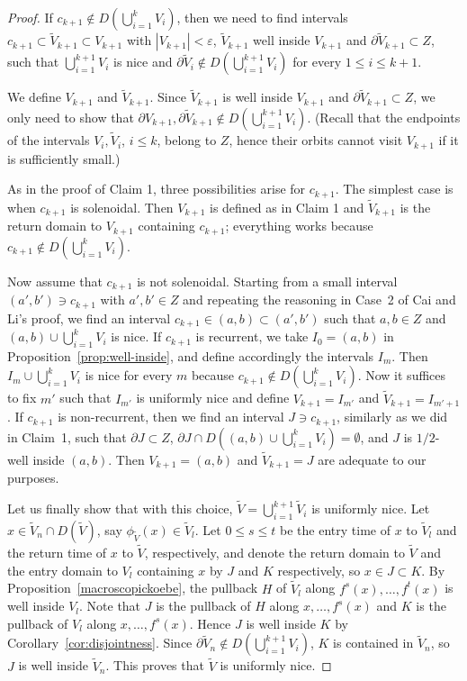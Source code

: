 \documentclass[12pt, psamsfonts, reqno]{amsart}
\begin{document}
\begin{proof}
 If $c_{k+1}\notin D(\bigcup_{i=1}^k V_i)$, then we need to find
 intervals $c_{k+1}\subset \tilde V_{k+1}\subset V_{k+1}$ with
 $|V_{k+1}|<{\varepsilon}$, $\tilde V_{k+1}$ well inside $V_{k+1}$ and
 $\partial \tilde V_{k+1}\subset Z$, such that $\bigcup_{i=1}^{k+1} V_i$ is
 nice and $\partial \tilde V_i\notin D(\bigcup_{i=1}^{k+1} V_i)$ for
 every $1\leq i\leq k+1$.

 We define $V_{k+1}$ and $\tilde V_{k+1}$.
 Since $\tilde V_{k+1}$ is well inside
 $V_{k+1}$ and $\partial \tilde V_{k+1}\subset Z$, we only need
 to show that $\partial V_{k+1},\partial \tilde V_{k+1}
 \notin D(\bigcup_{i=1}^{k+1} V_i)$. (Recall that the endpoints of the intervals $V_i,\tilde
 V_i$, $i\leq k$, belong to $Z$, hence their orbits cannot visit
 $V_{k+1}$ if it is sufficiently small.)

 As in the proof of Claim 1, three possibilities
 arise for $c_{k+1}$. The simplest case is when $c_{k+1}$ is
 solenoidal. Then $V_{k+1}$ is defined as in Claim 1 and $\tilde
 V_{k+1}$ is the return domain to $V_{k+1}$ containing $c_{k+1}$;
 everything works because $c_{k+1}\notin D(\bigcup_{i=1}^k V_i)$.

 Now assume that $c_{k+1}$ is not solenoidal. Starting from a
 small interval $(a',b')\owns c_{k+1}$ with $a',b'\in Z$
 and repeating the reasoning in Case~2 of Cai and Li's proof, we
 find an interval $c_{k+1}\in (a,b)\subset (a',b')$ such that
 $a,b\in Z$ and
 $(a,b)\cup \bigcup_{i=1}^k V_i$ is nice. If $c_{k+1}$ is recurrent,
 we take $I_0=(a,b)$ in  Proposition~\ref{prop:well-inside},
 and define accordingly the intervals $I_m$.
 Then $I_m\cup \bigcup_{i=1}^k V_i$ is nice for every $m$
 because $c_{k+1}\notin D(\bigcup_{i=1}^k V_i)$. Now it suffices to
 fix $m'$ such that $I_{m'}$ is uniformly nice and
 define $V_{k+1}=I_{m'}$ and $\tilde V_{k+1}=I_{m'+1}$. If
 $c_{k+1}$ is non-recurrent, then we find an
 interval $J\owns c_{k+1}$, similarly as we did in
 Claim~1, such that
 $\partial J\subset Z$,
 $\partial J\cap D((a,b)\cup \bigcup_{i=1}^k V_i)=\emptyset$, and
 $J$ is $1/2$-well inside $(a,b)$. Then $V_{k+1}=(a,b)$
 and $\tilde V_{k+1}=J$ are adequate to our purposes.

Let us finally show that with this choice,
 $\tilde V=\bigcup_{i=1}^{k+1} \tilde V_i$ is uniformly nice.
 Let $x\in\tilde V_n \cap D(\tilde V)$, say $\phi_{\tilde V}(x) \in \tilde
V_l$. Let $0 \leq s \leq t$ be the entry time of $x$ to $\tilde
V_l$ and the return time of $x$ to $\tilde V$, respectively, and
denote the return domain to $\tilde V$ and the entry domain to
$V_l$ containing $x$ by $J$ and $K$ respectively, so $x \in J
\subset K$.
 By Proposition~\ref{macroscopickoebe}, the pullback $H$ of
 $\tilde V_l$ along $f^{s}(x),\ldots, f^t(x)$ is well inside $V_l$.
 Note that $J$ is the pullback of $H$ along $x,\ldots,f^s(x)$ and $K$ is
 the pullback of $V_l$ along $x,\ldots,f^s(x)$. Hence $J$ is well
 inside $K$ by Corollary~\ref{cor:disjointness}. Since
 $\partial \tilde V_n\notin D(\bigcup_{i=1}^{k+1} V_i)$, $K$ is
 contained in $\tilde V_n$, so $J$ is well inside $\tilde V_n$.
 This proves that $\tilde V$ is uniformly nice.
\end{proof}
\end{document}
